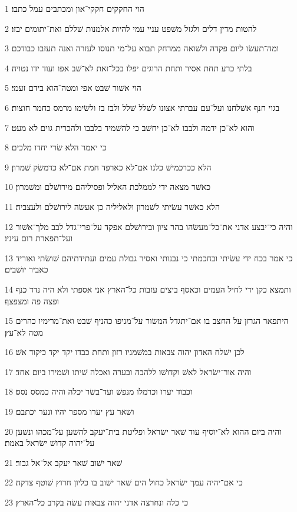 \par 1 הוי החקקים חקקי־און ומכתבים עמל כתבו׃
\par 2 להטות מדין דלים ולגזל משׁפט עניי עמי להיות אלמנות שׁללם ואת־יתומים יבזו׃
\par 3 ומה־תעשׂו ליום פקדה ולשׁואה ממרחק תבוא על־מי תנוסו לעזרה ואנה תעזבו כבודכם׃
\par 4 בלתי כרע תחת אסיר ותחת הרוגים יפלו בכל־זאת לא־שׁב אפו ועוד ידו נטויה׃
\par 5 הוי אשׁור שׁבט אפי ומטה־הוא בידם זעמי׃
\par 6 בגוי חנף אשׁלחנו ועל־עם עברתי אצונו לשׁלל שׁלל ולבז בז ולשׂימו מרמס כחמר חוצות׃
\par 7 והוא לא־כן ידמה ולבבו לא־כן יחשׁב כי להשׁמיד בלבבו ולהכרית גוים לא מעט׃
\par 8 כי יאמר הלא שׂרי יחדו מלכים׃
\par 9 הלא ככרכמישׁ כלנו אם־לא כארפד חמת אם־לא כדמשׂק שׁמרון׃
\par 10 כאשׁר מצאה ידי לממלכת האליל ופסיליהם מירושׁלם ומשׁמרון׃
\par 11 הלא כאשׁר עשׂיתי לשׁמרון ולאליליה כן אעשׂה לירושׁלם ולעצביה׃
\par 12 והיה כי־יבצע אדני את־כל־מעשׂהו בהר ציון ובירושׁלם אפקד על־פרי־גדל לבב מלך־אשׁור ועל־תפארת רום עיניו׃
\par 13 כי אמר בכח ידי עשׂיתי ובחכמתי כי נבנותי ואסיר גבולת עמים ועתידתיהם שׁושׂתי ואוריד כאביר יושׁבים׃
\par 14 ותמצא כקן ידי לחיל העמים וכאסף ביצים עזבות כל־הארץ אני אספתי ולא היה נדד כנף ופצה פה ומצפצף׃
\par 15 היתפאר הגרזן על החצב בו אם־יתגדל המשׂור על־מניפו כהניף שׁבט ואת־מרימיו כהרים מטה לא־עץ׃
\par 16 לכן ישׁלח האדון יהוה צבאות במשׁמניו רזון ותחת כבדו יקד יקד כיקוד אשׁ׃
\par 17 והיה אור־ישׂראל לאשׁ וקדושׁו ללהבה ובערה ואכלה שׁיתו ושׁמירו ביום אחד׃
\par 18 וכבוד יערו וכרמלו מנפשׁ ועד־בשׂר יכלה והיה כמסס נסס׃
\par 19 ושׁאר עץ יערו מספר יהיו ונער יכתבם׃
\par 20 והיה ביום ההוא לא־יוסיף עוד שׁאר ישׂראל ופליטת בית־יעקב להשׁען על־מכהו ונשׁען על־יהוה קדושׁ ישׂראל באמת׃
\par 21 שׁאר ישׁוב שׁאר יעקב אל־אל גבור׃
\par 22 כי אם־יהיה עמך ישׂראל כחול הים שׁאר ישׁוב בו כליון חרוץ שׁוטף צדקה׃
\par 23 כי כלה ונחרצה אדני יהוה צבאות עשׂה בקרב כל־הארץ׃
